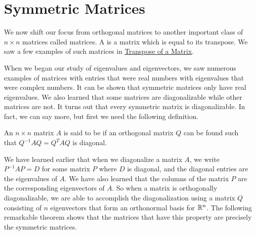 \documentclass{ximera}
\begin{document}
\section*{Symmetric Matrices}

We now shift our focus from orthogonal matrices to another important class of $n \times n$ matrices called  matrices.  A  is a matrix which is equal to its transpose.  We saw a few examples of such matrices in \href{https://ximera.osu.edu/linearalgebradzv3/LinearAlgebraInteractiveIntro/MAT-0025/main}{Transpose of a Matrix}.

When we began our study of eigenvalues and eigenvectors, we saw numerous examples of matrices with entries that were real numbers with eigenvalues that were complex numbers.  It can be shown that symmetric matrices only have real eigenvalues.  We also learned that some matrices are diagonalizable while other matrices are not.  It turns out that every symmetric matrix is diagonalizable.  In fact, we can say more, but first we need the following definition.

\begin{definition}\label{def:orthDiag}
An $n \times n$ matrix $A$ is said to be  if an orthogonal matrix $Q$ can be found such that  $Q^{-1}AQ = Q^{T}AQ$ is diagonal.
\end{definition}

We have learned earlier that when we diagonalize a matrix $A$, we write $P^{-1}AP=D$ for some matrix $P$ where $D$ is diagonal, and the diagonal entries are the eigenvalues of $A$.  We have also learned that the columns of the matrix $P$ are the corresponding eigenvectors of $A$.  So when a matrix is orthogonally diagonalizable, we are able to accomplish the diagonalization using a matrix $Q$ consisting of $n$ eigenvectors that form an orthonormal basis for $\mathbb{R}^n$.  The following remarkable theorem shows that the matrices that have this property are precisely the symmetric matrices.
\end{document}
